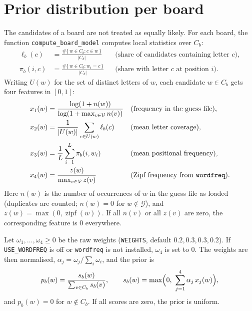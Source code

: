 \documentclass[11pt,a4paper]{article}
\theoremstyle{definition}
\theoremstyle{remark}
\newcommand{\G}{\mathcal{G}}
\newcommand{\V}{\mathcal{V}}
\begin{document}
\section{Prior distribution per board}

The candidates of a board are not treated as equally likely.
For each board, the function \texttt{compute\_board\_model}
computes local statistics over $C_b$:
\begin{align*}
  \ell_b(c)   &= \frac{\#\{\, w \in C_b : c \in w \,\}}{|C_b|}
               && \text{(share of candidates containing letter } c\text{)},\\
  \pi_b(i,c)  &= \frac{\#\{\, w \in C_b : w_i = c \,\}}{|C_b|}
               && \text{(share with letter } c \text{ at position } i\text{)}.
\end{align*}
Writing $U(w)$ for the set of distinct letters of $w$, each candidate $w \in C_b$
gets four features in $[0,1]$:
\begin{align*}
  x_1(w) &= \frac{\log(1+n(w))}{\log(1+\max_{v \in \V} n(v))} && \text{(frequency in the guess file)},\\
  x_2(w) &= \frac{1}{|U(w)|}\sum_{c \in U(w)} \ell_b(c) && \text{(mean letter coverage)},\\
  x_3(w) &= \frac{1}{L}\sum_{i=1}^{L} \pi_b(i,w_i) && \text{(mean positional frequency)},\\
  x_4(w) &= \frac{z(w)}{\max_{v \in \V} z(v)} && \text{(Zipf frequency from \texttt{wordfreq})}.
\end{align*}
Here $n(w)$ is the number of occurrences of $w$ in the guess file as loaded
(duplicates are counted; $n(w)=0$ for $w \notin \G$), and
$z(w) = \max(0, \operatorname{zipf}(w))$.
If all $n(v)$ or all $z(v)$ are zero, the corresponding feature is $0$ everywhere.

Let $\omega_1,\dots,\omega_4 \ge 0$ be the raw weights (\texttt{WEIGHTS}, default
$0.2,0.3,0.3,0.2$). If \texttt{USE\_WORDFREQ} is off or \texttt{wordfreq} is not installed,
$\omega_4$ is set to $0$. The weights are then normalised,
$\alpha_j = \omega_j / \sum_{i} \omega_i$, and the prior is
\[
  p_b(w) = \frac{s_b(w)}{\sum_{v \in C_b} s_b(v)},
  \qquad
  s_b(w) = \max\Bigl(0,\ \sum_{j=1}^{4} \alpha_j\, x_j(w)\Bigr),
\]
and $p_b(w) = 0$ for $w \notin C_b$. If all scores are zero, the prior is uniform.
\end{document}
